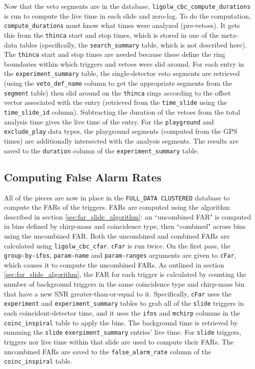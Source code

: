 Now that the veto segments are in the database,
\verb|ligolw_cbc_compute_durations| is run to compute the live time in each
slide and zero-lag. To do the computation, \verb|compute_durations| must know
what times were analyzed (pre-vetoes). It gets this from the \verb|thinca|
start and stop times, which is stored in one of the meta-data tables
(specifically, the \verb|search_summary| table, which is not described here).
The \verb|thinca| start and stop times are needed because these define the ring
boundaries within which triggers and vetoes were slid around. For each entry in
the \verb|experiment_summary| table, the single-detector veto segments are
retrieved (using the \verb|veto_def_name| column to get the appropriate
segments from the \verb|segment| table) then slid around on the \verb|thinca|
rings according to the offset vector associated with the entry (retrieved from
the \verb|time_slide| using the \verb|time_slide_id| column). Subtracting the
duration of the vetoes from the total analysis time gives the live time of the
entry. For the \verb|playground| and \verb|exclude_play| data types, the
playground segments (computed from the GPS times) are additionally intersected
with the analysis segments. The results are saved to the \verb|duration| column
of the \verb|experiment_summary| table.

\subsection{Computing False Alarm Rates}
\label{sec:cfar}

All of the pieces are now in place in the \verb|FULL_DATA CLUSTERED| database
to compute the \acp{FAR} of the triggers. \acp{FAR} are computed using the
algorithm described in section \ref{sec:far_slide_algorithm}: an ``uncombined
\ac{FAR}" is computed in bins defined by chirp-mass and coincidence type, then
``combined" across bins using the uncombined \ac{FAR}. Both the uncombined and
combined \acp{FAR} are calculated using \verb|ligolw_cbc_cfar|. \verb|cFar| is
run twice. On the first pass, the \verb|group-by-ifos|, \verb|param-name| and
\verb|param-ranges| arguments are given to \verb|cFar|, which causes it to
compute the uncombined \acp{FAR}. As outlined in section
\ref{sec:far_slide_algorithm}, the \ac{FAR} for each trigger is calculated by
counting the number of background triggers in the same coincidence type and
chirp-mass bin that have a new \ac{SNR} greater-than-or-equal to it.
Specifically, \verb|cFar| uses the \verb|experiment| and
\verb|experiment_summary| tables to grab all of the \verb|slide| triggers in
each coincident-detector time, and it uses the \verb|ifos| and \verb|mchirp|
columns in the \verb|coinc_inspiral| table to apply the bins. The background
time is retrieved by summing the \verb|slide| \verb|exerpiment_summary|
entries' live time. For \verb|slide| triggers, triggers nor live time within
that slide are used to compute their \acp{FAR}. The uncombined \acp{FAR} are
saved to the \verb|false_alarm_rate| column of the \verb|coinc_inspiral| table.

